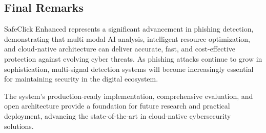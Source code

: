 \documentclass[conference]{IEEEtran}
\begin{document}
\subsection{Final Remarks}

SafeClick Enhanced represents a significant advancement in phishing detection, demonstrating that multi-modal AI analysis, intelligent resource optimization, and cloud-native architecture can deliver accurate, fast, and cost-effective protection against evolving cyber threats. As phishing attacks continue to grow in sophistication, multi-signal detection systems will become increasingly essential for maintaining security in the digital ecosystem.

The system's production-ready implementation, comprehensive evaluation, and open architecture provide a foundation for future research and practical deployment, advancing the state-of-the-art in cloud-native cybersecurity solutions.
\end{document}
